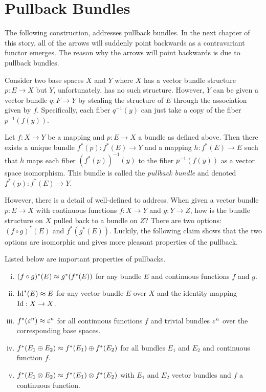 \documentclass[../sean_thesis.tex]{subfiles}
\begin{document}
\section{Pullback Bundles}

The following construction, addresses pullback bundles. In the next chapter of this story, all of the arrows will suddenly point backwards as a contravariant functor emerges. The reason why the arrows will point backwards is due to pullback bundles.

Consider two base spaces $X$ and $Y$ where $X$ has a vector bundle structure $p: E \to X$ but $Y$, unfortunately, has no such structure. However, $Y$ can be given a vector bundle $q: F \to Y$ by stealing the structure of $E$ through the association given by $f$. Specifically, each fiber $q^{-1}(y)$ can just take a copy of the fiber $p^{-1}(f(y))$. 


\begin{definition}
\label{def:pullback}
	Let $f: X \to Y$ be a mapping and $p: E \to X$ a bundle as defined above. Then there exists a unique bundle $f^{*}(p): f^{*}(E) \to Y$ and a mapping $h: f^{*}(E) \to E$ such that $h$ maps each fiber $(f^{*}(p))^{-1}(y)$ to the fiber $p^{-1}(f(y))$ as a vector space isomorphism. This bundle is called the \emph{pullback bundle} and denoted $f^{*}(p): f^{*}(E) \to Y$.
\end{definition}


However, there is a detail of well-defined to address. When given a vector bundle $p: E \to X$ with continuous functions $f: X \to Y$ and $g: Y \to Z$, how is the bundle structure on $X$ pulled back to a bundle on $Z$? There are two options: $(f \circ g)^{*}(E)$ and $f^{*}(g^{*}(E))$. Luckily, the following claim shows that the two options are isomorphic and gives more pleasant properties of the pullback.

\begin{claim}
	Listed below are important properties of pullbacks.
	\vspace{-\varparskip}
	\begin{enumerate}[(i)]
		\item $(f \circ g)^{*}(E) \approx g^{*}(f^{*}(E))$ for any bundle $E$ and continuous functions $f$ and $g$.
		\item $\operatorname{Id}^{*}(E) \approx E$ for any vector bundle $E$ over $X$ and the identity mapping $\operatorname{Id}: X \to X$.
		\item $f^{*}(\varepsilon^{n}) \approx \varepsilon^{n}$ for all continuous functions $f$ and trivial bundles $\varepsilon^{n}$ over the corresponding base spaces.
		\item $f^{*}(E_1 \oplus E_2) \approx f^{*}(E_1) \oplus f^{*}(E_2)$ for all bundles $E_1$ and $E_2$ and continuous function $f$.
		\item $f^{*}(E_1 \otimes E_2) \approx f^{*}(E_1) \otimes f^{*}(E_2)$ with $E_1$ and $E_2$ vector bundles and $f$ a continuous function.
	\end{enumerate}
\end{claim}
\end{document}
